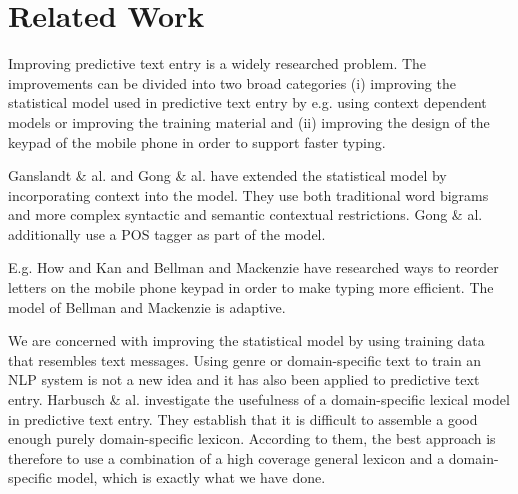 \documentclass[a4paper,conference]{IEEEtran}
\begin{document}

\section{Related Work}
\label{sec:related-work}

Improving predictive text entry is a widely researched problem. The
improvements can be divided into two broad categories (i) improving
the statistical model used in predictive text entry by e.g. using
context dependent models or improving the training material and (ii)
improving the design of the keypad of the mobile phone in order to
support faster typing.

Ganslandt \& al. \cite{ganslandt/2009} and Gong \&
al. \cite{gong/2008} have extended the statistical model by
incorporating context into the model. They use both traditional word
bigrams and more complex syntactic and semantic contextual
restrictions. Gong \& al. additionally use a POS tagger as part of the
model.

E.g. How and Kan \cite{how05optimizing} and Bellman and Mackenzie
\cite{Department98aprobabilistic} have researched ways to reorder
letters on the mobile phone keypad in order to make typing more
efficient. The model of Bellman and Mackenzie is adaptive.

We are concerned with improving the statistical model by using
training data that resembles text messages. Using genre or
domain-specific text to train an NLP system is not a new idea and it
has also been applied to predictive text entry. Harbusch \&
al. \cite{Harbusch/2003} investigate the usefulness of a
domain-specific lexical model in predictive text entry. They establish
that it is difficult to assemble a good enough purely domain-specific
lexicon. According to them, the best approach is therefore to use a
combination of a high coverage general lexicon and a domain-specific
model, which is exactly what we have done.
\end{document}
